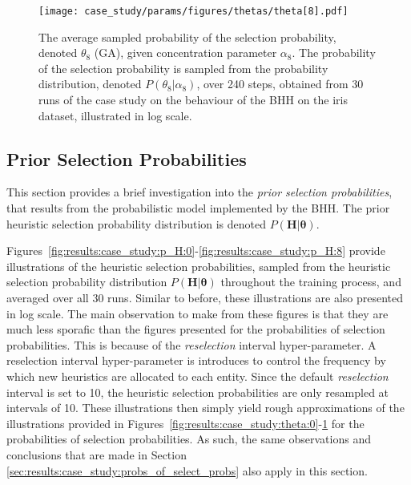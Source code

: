 \begin{figure}[htpb]
	\centering
	\texttt{[image: case\_study/params/figures/thetas/theta[8].pdf]}
	\caption{The average sampled probability of the selection probability, denoted $\theta_{8}$ (\acs{GA}), given concentration parameter $\alpha_{8}$. The probability of the selection probability is sampled from the probability distribution, denoted $P(\theta_{8} \vert \alpha_{8})$, over 240 steps, obtained from 30 runs of the case study on the behaviour of the \acs{BHH} on the iris dataset, illustrated in log scale.}
	\label{fig:results:case_study:theta:8}
\end{figure}


\subsection{Prior Selection Probabilities}\label{sec:results:case_study:prior_selec_prob}

This section provides a brief investigation into the \textit{prior selection probabilities}, that results from the probabilistic model implemented by the \acs{BHH}. The prior heuristic selection probability distribution is denoted $P(\boldsymbol{H} \vert \boldsymbol{\theta})$.

Figures~\ref{fig:results:case_study:p_H:0}-\ref{fig:results:case_study:p_H:8} provide illustrations of the heuristic selection probabilities, sampled from the heuristic selection probability distribution $P(\boldsymbol{H} \vert \boldsymbol{\theta})$ throughout the training process, and averaged over all 30 runs. Similar to before, these illustrations are also presented in log scale. The main observation to make from these figures is that they are much less sporafic than the figures presented for the probabilities of selection probabilities. This is because of the \textit{reselection} interval hyper-parameter. A reselection interval hyper-parameter is introduces to control the frequency by which new heuristics are allocated to each entity. Since the default \textit{reselection} interval is set to 10, the heuristic selection probabilities are only resampled at intervals of 10. These illustrations then simply yield rough approximations of the illustrations provided in Figures~\ref{fig:results:case_study:theta:0}-\ref{fig:results:case_study:theta:8} for the probabilities of selection probabilities. As such, the same observations and conclusions that are made in Section \ref{sec:results:case_study:probs_of_select_probs} also apply in this section.

